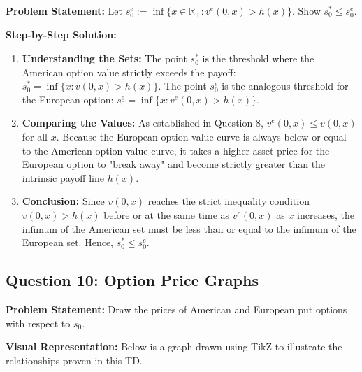 \textbf{Problem Statement:}
Let $s_0^e := \inf\{x \in \mathbb{R}_+ : v^e(0,x) > h(x)\}$. Show $s_0^* \le s_0^e$.

\textbf{Step-by-Step Solution:}
\begin{enumerate}
    \item \textbf{Understanding the Sets:} 
    The point $s_0^*$ is the threshold where the American option value strictly exceeds the payoff: $s_0^* = \inf\{x : v(0,x) > h(x)\}$.
    The point $s_0^e$ is the analogous threshold for the European option: $s_0^e = \inf\{x : v^e(0,x) > h(x)\}$.
    
    \item \textbf{Comparing the Values:} 
    As established in Question 8, $v^e(0,x) \le v(0,x)$ for all $x$. 
    Because the European option value curve is always below or equal to the American option value curve, it takes a higher asset price for the European option to "break away" and become strictly greater than the intrinsic payoff line $h(x)$.
    
    \item \textbf{Conclusion:} Since $v(0,x)$ reaches the strict inequality condition $v(0,x) > h(x)$ before or at the same time as $v^e(0,x)$ as $x$ increases, the infimum of the American set must be less than or equal to the infimum of the European set. Hence, $s_0^* \le s_0^e$.
\end{enumerate}

\subsection*{Question 10: Option Price Graphs}

\textbf{Problem Statement:}
Draw the prices of American and European put options with respect to $s_0$.

\textbf{Visual Representation:}
Below is a graph drawn using TikZ to illustrate the relationships proven in this TD.

